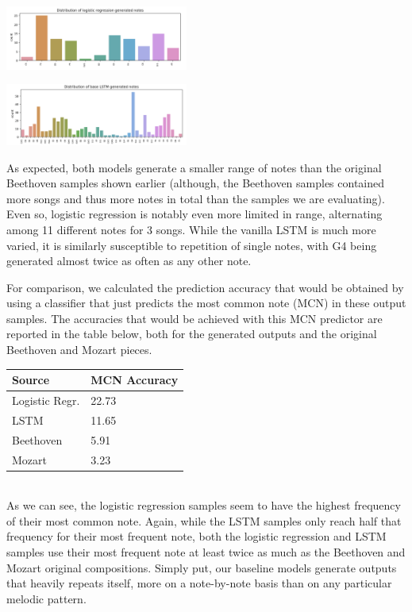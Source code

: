 \documentclass[twoside,twocolumn]{article}
\begin{document}
\includegraphics[width = 0.45\textwidth]{images/logreg_notes.png}

\includegraphics[width = 0.45\textwidth]{images/simple_lstm_notes.png}

As expected, both models generate a smaller range of notes than the original Beethoven samples shown earlier (although, the Beethoven samples contained more songs and thus more notes in total than the samples we are evaluating). Even so, logistic regression is notably even more limited in range, alternating among 11 different notes for 3 songs. While the vanilla LSTM is much more varied, it is similarly susceptible to repetition of single notes, with G4 being generated almost twice as often as any other note. 

For comparison, we calculated the prediction accuracy that would be obtained by using a classifier that just predicts the most common note (MCN) in these output samples. The accuracies that would be achieved with this MCN predictor are reported in the table below, both for the generated outputs and the original Beethoven and Mozart pieces. \\

\begin{tabular}{|l|l|}
\hline
\textbf{Source} & \textbf{MCN Accuracy} \\ \hline
Logistic Regr.  & 22.73                 \\ \hline
LSTM            & 11.65                 \\ \hline
Beethoven       & 5.91                  \\ \hline
Mozart          & 3.23                  \\ \hline
\end{tabular} \\

As we can see, the logistic regression samples seem to have the highest frequency of their most common note. Again, while the LSTM samples only reach half that frequency for their most frequent note, both the logistic regression and LSTM samples use their most frequent note at least twice as much as the Beethoven and Mozart original compositions. Simply put, our baseline models generate outputs that heavily repeats itself, more on a note-by-note basis than on any particular melodic pattern.
\end{document}
